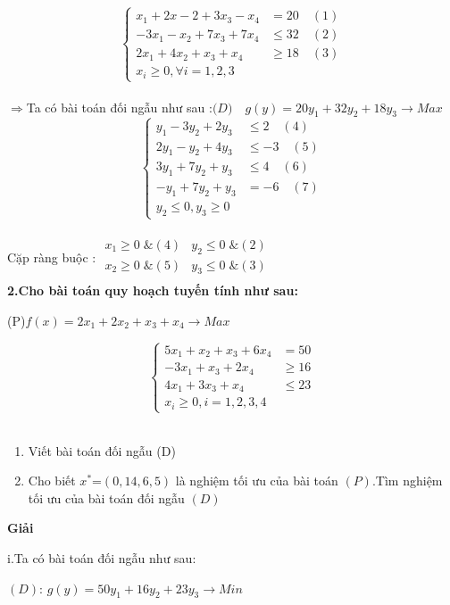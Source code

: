 \documentclass{article}
\begin{document}
\[\left\{\begin{aligned}
x_1+2x-2+3x_3-x_4&=20 \quad(1)\\
-3x_1-x_2+7x_3+7x_4&\leq 32 \quad(2)\\
2x_1+4x_2+x_3+x_4&\geq 18 \quad(3)\\
x_i\geq 0,\forall i=1,2,3
\end{aligned}\right.\]\\
$\Longrightarrow$Ta có bài toán đối ngẫu như sau :$ \big(D\big)\quad g(y)=20y_1+32y_2+18y_3 \longrightarrow Max$ \\
\[\left\{\begin{aligned}
y_1-3y_2+2y_3&\leq 2 \quad(4)\\
2y_1-y_2+4y_3&\leq-3 \quad(5)\\
3y_1+7y_2+y_3&\leq 4 \quad(6)\\
-y_1+7y_2+y_3&=-6 \quad(7)\\
y_2\leq 0,y_3\geq 0
\end{aligned}\right.\]\\
Cặp ràng buộc : $\begin{array}{cr} 
x_1\geq 0\; \&(4) &y_2\leq 0\; \&(2)\\
x_2\geq 0\; \&(5) &y_3\leq 0\; \&(3)\\
\end{array}$\\
\textbf{2.Cho bài toán quy hoạch tuyến tính như sau:}\\
\begin{center}
\big(P\big)\quad $f(x)=2x_1+2x_2+x_3+x_4 \longrightarrow Max$\\
\end{center}
\[\left\{\begin{aligned}
5x_1+x_2+x_3+6x_4&=50 \\
-3x_1+x_3+2x_4&\geq16 \\
4x_1+3x_3+x_4&\leq23 \\
x_i\geq 0,i=1,2,3,4 
\end{aligned}\right.\]\\
\begin{enumerate}
\item Viết bài toán đối ngẫu \big(D\big)
\item Cho biết $x^*$=$\left(0,14,6,5\right)$ là nghiệm tối ưu của bài toán $\left(P\right)$.Tìm nghiệm tối ưu của bài toán đối ngẫu $\left(D\right)$
\end{enumerate}
\begin{center}
\textbf{Giải}
\end{center}
i.Ta có bài toán đối ngẫu như sau:\\
\begin{center}
$\left(D\right)$: $g(y)=50y_1+16y_2+23y_3 \longrightarrow  Min$\\
\end{center}
\end{document}
